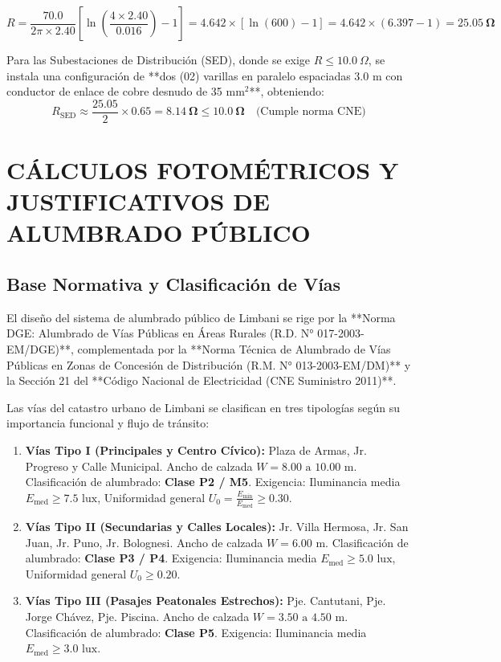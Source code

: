 $$R = \frac{70.0}{2 \pi \times 2.40} \left[ \ln\left( \frac{4 \times 2.40}{0.016} \right) - 1 \right] = 4.642 \times [ \ln(600) - 1 ] = 4.642 \times (6.397 - 1) = \mathbf{25.05\ \Omega}$$

Para las Subestaciones de Distribución (SED), donde se exige $R \le 10.0\ \Omega$, se instala una configuración de **dos (02) varillas en paralelo espaciadas $3.0\text{ m}$ con conductor de enlace de cobre desnudo de 35 mm$^2$**, obteniendo:
$$R_{\text{SED}} \approx \frac{25.05}{2} \times 0.65 = \mathbf{8.14\ \Omega} \le \mathbf{10.0\ \Omega} \quad \text{(Cumple norma CNE)}$$

\section{CÁLCULOS FOTOMÉTRICOS Y JUSTIFICATIVOS DE ALUMBRADO PÚBLICO}

\subsection{Base Normativa y Clasificación de Vías}
El diseño del sistema de alumbrado público de Limbani se rige por la **Norma DGE: Alumbrado de Vías Públicas en Áreas Rurales (R.D. N° 017-2003-EM/DGE)**, complementada por la **Norma Técnica de Alumbrado de Vías Públicas en Zonas de Concesión de Distribución (R.M. N° 013-2003-EM/DM)** y la Sección 21 del **Código Nacional de Electricidad (CNE Suministro 2011)**.

Las vías del catastro urbano de Limbani se clasifican en tres tipologías según su importancia funcional y flujo de tránsito:
\begin{enumerate}
    \item \textbf{Vías Tipo I (Principales y Centro Cívico):} Plaza de Armas, Jr. Progreso y Calle Municipal. Ancho de calzada $W = 8.00\text{ a } 10.00\text{ m}$. Clasificación de alumbrado: \textbf{Clase P2 / M5}. Exigencia: Iluminancia media $E_{\text{med}} \ge 7.5\text{ lux}$, Uniformidad general $U_0 = \frac{E_{\text{min}}}{E_{\text{med}}} \ge 0.30$.
    \item \textbf{Vías Tipo II (Secundarias y Calles Locales):} Jr. Villa Hermosa, Jr. San Juan, Jr. Puno, Jr. Bolognesi. Ancho de calzada $W = 6.00\text{ m}$. Clasificación de alumbrado: \textbf{Clase P3 / P4}. Exigencia: Iluminancia media $E_{\text{med}} \ge 5.0\text{ lux}$, Uniformidad general $U_0 \ge 0.20$.
    \item \textbf{Vías Tipo III (Pasajes Peatonales Estrechos):} Pje. Cantutani, Pje. Jorge Chávez, Pje. Piscina. Ancho de calzada $W = 3.50\text{ a } 4.50\text{ m}$. Clasificación de alumbrado: \textbf{Clase P5}. Exigencia: Iluminancia media $E_{\text{med}} \ge 3.0\text{ lux}$.
\end{enumerate}

